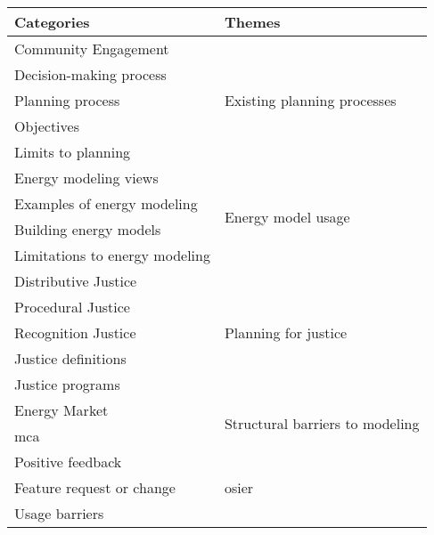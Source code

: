 \begin{tabular}{ll}
    \toprule
    Categories & Themes \\
    \midrule
    Community Engagement&\multirow{5}{*}{Existing planning processes}\\
    Decision-making process&\\
    Planning process&\\
    Objectives&\\
    Limits to planning&\\
    \midrule
    Energy modeling views&\multirow{4}{*}{Energy model usage}\\
    Examples of energy modeling&\\
    Building energy models&\\
    Limitations to energy modeling&\\
    \midrule
    Distributive Justice&\multirow{5}{*}{Planning for justice}\\
    Procedural Justice&\\
    Recognition Justice&\\
    Justice definitions&\\
    Justice programs&\\
    \midrule
    Energy Market&\multirow{2}{*}{Structural barriers to modeling}\\
    \acl{mca}&\\
    \midrule
    Positive feedback&\multirow{3}{*}{\ac{osier}}\\
    Feature request or change&\\
    Usage barriers&\\
    \bottomrule
\end{tabular}